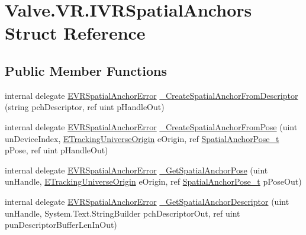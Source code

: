 \hypertarget{struct_valve_1_1_v_r_1_1_i_v_r_spatial_anchors}{}\section{Valve.\+V\+R.\+I\+V\+R\+Spatial\+Anchors Struct Reference}
\label{struct_valve_1_1_v_r_1_1_i_v_r_spatial_anchors}
\subsection*{Public Member Functions}
\begin{DoxyCompactItemize}
\item 
internal delegate \mbox{\hyperlink{namespace_valve_1_1_v_r_ab0aeb9b02c0851286deb0b4134b220d4}{E\+V\+R\+Spatial\+Anchor\+Error}} \mbox{\hyperlink{struct_valve_1_1_v_r_1_1_i_v_r_spatial_anchors_ab4d806db18bce645affea7c6ea454059}{\+\_\+\+Create\+Spatial\+Anchor\+From\+Descriptor}} (string pch\+Descriptor, ref uint p\+Handle\+Out)
\item 
internal delegate \mbox{\hyperlink{namespace_valve_1_1_v_r_ab0aeb9b02c0851286deb0b4134b220d4}{E\+V\+R\+Spatial\+Anchor\+Error}} \mbox{\hyperlink{struct_valve_1_1_v_r_1_1_i_v_r_spatial_anchors_a62e9fc61756a4d44558e01efefa17330}{\+\_\+\+Create\+Spatial\+Anchor\+From\+Pose}} (uint un\+Device\+Index, \mbox{\hyperlink{namespace_valve_1_1_v_r_a29be99a3c2f780157bd490db06a7f12f}{E\+Tracking\+Universe\+Origin}} e\+Origin, ref \mbox{\hyperlink{struct_valve_1_1_v_r_1_1_spatial_anchor_pose__t}{Spatial\+Anchor\+Pose\+\_\+t}} p\+Pose, ref uint p\+Handle\+Out)
\item 
internal delegate \mbox{\hyperlink{namespace_valve_1_1_v_r_ab0aeb9b02c0851286deb0b4134b220d4}{E\+V\+R\+Spatial\+Anchor\+Error}} \mbox{\hyperlink{struct_valve_1_1_v_r_1_1_i_v_r_spatial_anchors_a77ab8b9b1a7b448eab589d2d84b43ca5}{\+\_\+\+Get\+Spatial\+Anchor\+Pose}} (uint un\+Handle, \mbox{\hyperlink{namespace_valve_1_1_v_r_a29be99a3c2f780157bd490db06a7f12f}{E\+Tracking\+Universe\+Origin}} e\+Origin, ref \mbox{\hyperlink{struct_valve_1_1_v_r_1_1_spatial_anchor_pose__t}{Spatial\+Anchor\+Pose\+\_\+t}} p\+Pose\+Out)
\item 
internal delegate \mbox{\hyperlink{namespace_valve_1_1_v_r_ab0aeb9b02c0851286deb0b4134b220d4}{E\+V\+R\+Spatial\+Anchor\+Error}} \mbox{\hyperlink{struct_valve_1_1_v_r_1_1_i_v_r_spatial_anchors_aaf6ca9028d56903fe2a6ef154ae4dcab}{\+\_\+\+Get\+Spatial\+Anchor\+Descriptor}} (uint un\+Handle, System.\+Text.\+String\+Builder pch\+Descriptor\+Out, ref uint pun\+Descriptor\+Buffer\+Len\+In\+Out)
\end{DoxyCompactItemize}

